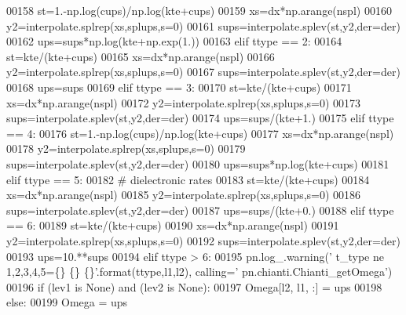 \begin{DoxyCode}
00158                     st=1.-np.log(cups)/np.log(kte+cups)
00159                     xs=dx*np.arange(nspl)
00160                     y2=interpolate.splrep(xs,splups,s=0)
00161                     sups=interpolate.splev(st,y2,der=der)
00162                     ups=sups*np.log(kte+np.exp(1.))
00163                 \textcolor{keywordflow}{elif} ttype == 2:
00164                     st=kte/(kte+cups)
00165                     xs=dx*np.arange(nspl)
00166                     y2=interpolate.splrep(xs,splups,s=0)
00167                     sups=interpolate.splev(st,y2,der=der)
00168                     ups=sups
00169                 \textcolor{keywordflow}{elif} ttype == 3:
00170                     st=kte/(kte+cups)
00171                     xs=dx*np.arange(nspl)
00172                     y2=interpolate.splrep(xs,splups,s=0)
00173                     sups=interpolate.splev(st,y2,der=der)
00174                     ups=sups/(kte+1.)
00175                 \textcolor{keywordflow}{elif} ttype == 4:
00176                     st=1.-np.log(cups)/np.log(kte+cups)
00177                     xs=dx*np.arange(nspl)
00178                     y2=interpolate.splrep(xs,splups,s=0)
00179                     sups=interpolate.splev(st,y2,der=der)
00180                     ups=sups*np.log(kte+cups)
00181                 \textcolor{keywordflow}{elif} ttype == 5:
00182                     \textcolor{comment}{# dielectronic rates}
00183                     st=kte/(kte+cups)
00184                     xs=dx*np.arange(nspl)
00185                     y2=interpolate.splrep(xs,splups,s=0)
00186                     sups=interpolate.splev(st,y2,der=der)
00187                     ups=sups/(kte+0.)
00188                 \textcolor{keywordflow}{elif} ttype == 6:
00189                     st=kte/(kte+cups)
00190                     xs=dx*np.arange(nspl)
00191                     y2=interpolate.splrep(xs,splups,s=0)
00192                     sups=interpolate.splev(st,y2,der=der)
00193                     ups=10.**sups
00194                 \textcolor{keywordflow}{elif} ttype > 6:
00195                     pn.log\_.warning(\textcolor{stringliteral}{' t\_type ne 1,2,3,4,5=\{\} \{\} \{\}'}.format(ttype,l1,l2), calling=\textcolor{stringliteral}{'
      pn.chianti.Chianti\_getOmega'})
00196             \textcolor{keywordflow}{if} (lev1 \textcolor{keywordflow}{is} \textcolor{keywordtype}{None}) \textcolor{keywordflow}{and} (lev2 \textcolor{keywordflow}{is} \textcolor{keywordtype}{None}):
00197                 Omega[l2, l1, :] = ups
00198             \textcolor{keywordflow}{else}:
00199                 Omega = ups

\end{DoxyCode}
